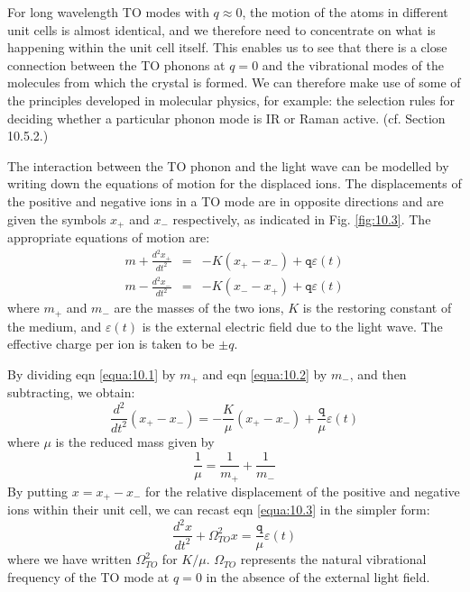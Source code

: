 \documentclass[12pt]{book}
\begin{document}
{For long wavelength TO modes with $q\approx0$, the motion of the atoms in different unit cells is almost identical, and we therefore need to concentrate on what is happening within the unit cell itself. This enables us to see that there is a close connection between the TO phonons at $q = 0$ and the vibrational modes of the molecules from which the crystal is formed. We can therefore make use of some of the principles developed in molecular physics, for example: the selection rules for deciding whether a particular phonon mode is IR or Raman active. (cf. Section 10.5.2.)

The interaction between the TO phonon and the light wave can be modelled by writing down the equations of motion for the displaced ions. The displacements of the positive and negative ions in a TO mode are in opposite directions and are given the symbols $x_+$ and $x_-$ respectively, as indicated in Fig. \ref{fig:10.3}. The appropriate equations of motion are:
\begin{eqnarray}
  m+\frac{d^2x_+}{dt^2} &=& -K(x_+-x_-)+\texttt{q}\varepsilon(t) \label{equa:10.1} \\
  m-\frac{d^2x_-}{dt^2} &=& -K(x_--x_+)+\texttt{q}\varepsilon(t) \label{equa:10.2}
\end{eqnarray}
where $m_+$ and $m_-$ are the masses of the two ions, $K$ is the restoring constant of the medium, and $\varepsilon(t)$ is the external electric field due to the light wave. The effective charge per ion is taken to be $\pm q$.

By dividing eqn \ref{equa:10.1} by $m_+$ and eqn \ref{equa:10.2} by $m_-$, and then subtracting, we obtain:
\begin{equation}\label{equa:10.3}
  \frac{d^2}{dt^2}(x_+-x_-)=-\frac{K}{\mu}(x_+-x_-)+\frac{\texttt{q}}{\mu}\varepsilon(t)
\end{equation}
where $\mu$ is the reduced mass given by
\begin{equation}\label{equa:10.4}
  \frac{1}{\mu}=\frac{1}{m_+}+\frac{1}{m_-}
\end{equation}
By putting $x = x_+ - x_-$ for the relative displacement of the positive and negative ions within their unit cell, we can recast eqn \ref{equa:10.3} in the simpler form:
\begin{equation}\label{equa:10.5}
  \frac{d^2x}{dt^2}+\Omega_{TO}^2x=\frac{\texttt{q}}{\mu}\varepsilon(t)
\end{equation}
where we have written $\Omega_{TO}^2$ for $K/\mu$. $\Omega_{TO}$ represents the natural vibrational frequency of the TO mode at $q = 0$ in the absence of the external light field.

}
\end{document}
